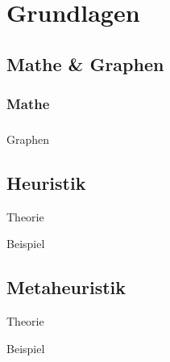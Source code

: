 \section{Grundlagen}
\subsection{Mathe \& Graphen}
\begin{frame}
\frametitle{Mathe}

\end{frame}

\subsubsection*{}
\begin{frame}{Graphen}

\end{frame}

\subsection{Heuristik}
\begin{frame}{Theorie}
\end{frame}
\begin{frame}{Beispiel}
\end{frame}


\subsection{Metaheuristik}
\begin{frame}{Theorie}

\end{frame}
\begin{frame}{Beispiel}
\end{frame}